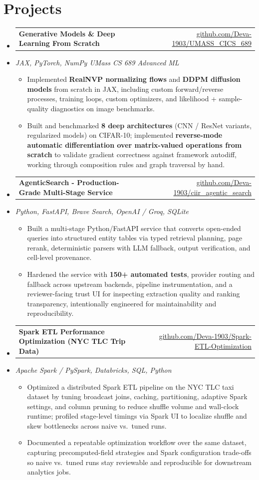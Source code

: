 \documentclass[letterpaper,10pt]{article}
\makeatletter
\newcommand{\resumeItem}[1]{
  \item\small{#1\vspace{-1pt}}
}
\newcommand{\resumeProjectHeading}[2]{
    \item
    \begin{tabular*}{0.985\textwidth}[t]{l@{\extracolsep{\fill}}r}
      \small\textbf{#1} & \small #2 \\
    \end{tabular*}\vspace{-5pt}
}
\newcommand{\resumeProjectSubheading}[1]{
  \vspace{-2pt}\item[] {\small\textcolor{ResumeSlate}{\emph{#1}}}\vspace{-3pt}
}
\newcommand{\resumeSubHeadingListStart}{\begin{itemize}[leftmargin=0.0in, label={}, itemsep=2pt, topsep=2pt]}
\newcommand{\resumeSubHeadingListEnd}{\end{itemize}}
\newcommand{\resumeItemListStart}{\begin{itemize}[leftmargin=0.18in, itemsep=2pt, topsep=1pt]}
\newcommand{\resumeItemListEnd}{\end{itemize}\vspace{-4pt}}
\makeatother
\begin{document}
\section{Projects}
\resumeSubHeadingListStart
  \resumeProjectHeading
    {Generative Models \& Deep Learning From Scratch}
    {\href{https://github.com/Deva-1903/UMASS_CICS_689}{github.com/Deva-1903/UMASS\_CICS\_689}}
  \resumeProjectSubheading{JAX, PyTorch, NumPy \enspace\textbar\enspace UMass CS 689 Advanced ML}
    \resumeItemListStart
      \resumeItem{Implemented \textbf{RealNVP normalizing flows} and \textbf{DDPM diffusion models} from scratch in JAX, including custom forward/reverse processes, training loops, custom optimizers, and likelihood + sample-quality diagnostics on image benchmarks.}
      \resumeItem{Built and benchmarked \textbf{8 deep architectures} (CNN / ResNet variants, regularized models) on CIFAR-10; implemented \textbf{reverse-mode automatic differentiation over matrix-valued operations from scratch} to validate gradient correctness against framework autodiff, working through composition rules and graph traversal by hand.}
    \resumeItemListEnd
  \resumeProjectHeading
    {AgenticSearch - Production-Grade Multi-Stage Service}
    {\href{https://github.com/Deva-1903/ciir_agentic_search}{github.com/Deva-1903/ciir\_agentic\_search}}
  \resumeProjectSubheading{Python, FastAPI, Brave Search, OpenAI / Groq, SQLite}
    \resumeItemListStart
      \resumeItem{Built a multi-stage Python/FastAPI service that converts open-ended queries into structured entity tables via typed retrieval planning, page rerank, deterministic parsers with LLM fallback, output verification, and cell-level provenance.}
      \resumeItem{Hardened the service with \textbf{150+ automated tests}, provider routing and fallback across upstream backends, pipeline instrumentation, and a reviewer-facing trust UI for inspecting extraction quality and ranking transparency, intentionally engineered for maintainability and reproducibility.}
    \resumeItemListEnd
  \resumeProjectHeading
    {Spark ETL Performance Optimization (NYC TLC Trip Data)}
    {\href{https://github.com/Deva-1903/Spark-ETL-Optimization}{github.com/Deva-1903/Spark-ETL-Optimization}}
  \resumeProjectSubheading{Apache Spark / PySpark, Databricks, SQL, Python}
    \resumeItemListStart
      \resumeItem{Optimized a distributed Spark ETL pipeline on the NYC TLC taxi dataset by tuning broadcast joins, caching, partitioning, adaptive Spark settings, and column pruning to reduce shuffle volume and wall-clock runtime; profiled stage-level timings via Spark UI to localize shuffle and skew bottlenecks across naive vs.\ tuned runs.}
      \resumeItem{Documented a repeatable optimization workflow over the same dataset, capturing precomputed-field strategies and Spark configuration trade-offs so naive vs.\ tuned runs stay reviewable and reproducible for downstream analytics jobs.}
    \resumeItemListEnd
\resumeSubHeadingListEnd
\vspace{-4pt}
\end{document}
